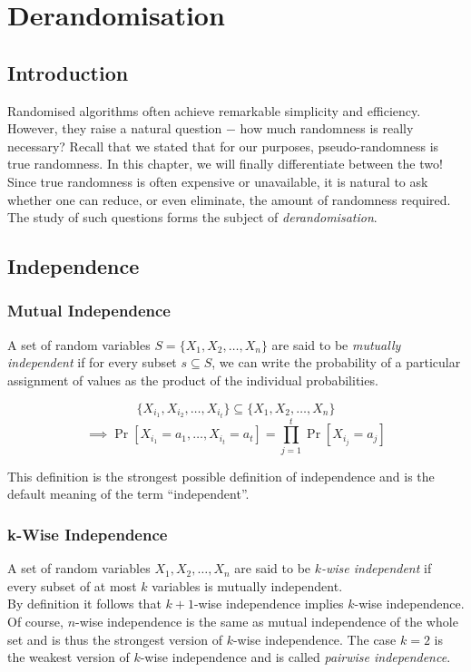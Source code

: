 \chapter{Derandomisation}

\section{Introduction}

Randomised algorithms often achieve remarkable simplicity and efficiency. However, they raise a natural 
question $-$ how much randomness is really necessary? Recall that we stated that for 
our purposes, pseudo-randomness is true randomness. In this chapter, we will finally differentiate between 
the two! Since true randomness is often expensive or unavailable, it is natural to ask whether one can 
reduce, or even eliminate, the amount of randomness required. The study of such questions forms the 
subject of \emph{derandomisation}. 

\section{Independence}

\subsection{Mutual Independence}
A set of random variables $S=\{X_1,X_2,\dots,X_n\}$ are said to be \emph{mutually independent} if for 
every subset $s\subseteq S$, we can write the probability of a particular assignment of values as the product 
of the individual probabilities. 

\[
\{X_{i_1},X_{i_2},\dots,X_{i_t}\}\subseteq\{X_1,X_2,\dots,X_n\}
\]
\[
\implies 
\Pr[X_{i_1}=a_1,\dots,X_{i_t}=a_t]
=
\prod_{j=1}^{t}\Pr[X_{i_j}=a_j]
\]

This definition is the strongest possible definition of independence and is the default meaning of the 
term ``independent''.

\subsection{k-Wise Independence}
A set of random variables $X_1,X_2,\dots,X_n$ are said to be \emph{$k$-wise independent} if every subset of 
at most $k$ variables is mutually independent.\\


\noindent By definition it follows that $k+1$-wise independence implies $k$-wise independence. Of course, 
$n$-wise independence is the same as mutual independence of the whole set and is thus the strongest 
version of $k$-wise independence. The case $k=2$ is the weakest version of $k$-wise independence and 
is called \emph{pairwise independence}.

